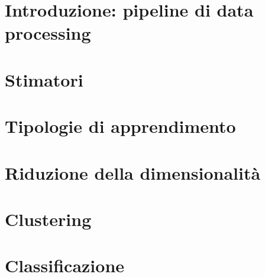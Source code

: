 \documentclass[italian, disablemarginnotes, allowcoloredmath]{../../../Resources/Utils/ClassNotes}
\begin{document}

\section{Introduzione: pipeline di data processing}


\section{Stimatori}


\section{Tipologie di apprendimento}


\section{Riduzione della dimensionalità}


\section{Clustering}


\section{Classificazione}

\end{document}
